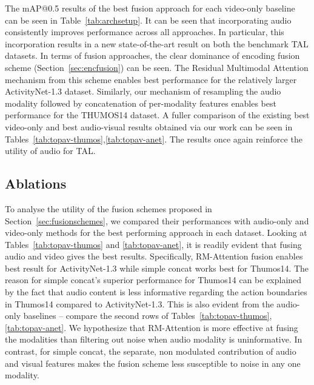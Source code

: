 \documentclass[10pt,twocolumn,letterpaper]{article}
\begin{document}
The mAP@0.5 results of the best fusion approach for each video-only baseline can be seen in Table~\ref{tab:archsetup}. It can be seen that incorporating audio consistently improves performance across all approaches. In particular, this incorporation results in a new state-of-the-art result on both the benchmark TAL datasets. In terms of fusion approaches, the clear dominance of encoding fusion scheme (Section~\ref{sec:encfusion}) can be seen. The Residual Multimodal Attention mechanism from this scheme enables best performance for the relatively larger ActivityNet-1.3 dataset. Similarly, our mechanism of resampling the audio modality followed by concatenation of per-modality features enables best performance for the THUMOS14 dataset. A fuller comparison of the existing best video-only and best audio-visual results obtained via our work can be seen in  Tables~\ref{tab:topav-thumos},\ref{tab:topav-anet}. The results once again reinforce the utility of audio for TAL. 





\subsection{Ablations}

To analyse the utility of the fusion schemes proposed in Section~\ref{sec:fusionschemes}, we compared their performances with audio-only  and video-only methods for the best performing approach in each dataset. Looking at Tables~\ref{tab:topav-thumos} and \ref{tab:topav-anet}, it is readily evident that fusing audio and video gives the best results. Specifically, RM-Attention fusion enables best result for ActivityNet-1.3 while simple concat works best for Thumos14. The reason for simple concat's superior performance for Thumos14 can be explained by the fact that audio content is less informative regarding the action boundaries in Thumos14 compared to ActivityNet-1.3. This is also evident from the audio-only baselines -- compare the second rows of Tables~\ref{tab:topav-thumos},\ref{tab:topav-anet}. We hypothesize that RM-Attention is more effective at fusing the modalities than filtering out noise when audio modality is uninformative.  In contrast, for simple concat, the separate, non modulated contribution of audio and visual features makes the fusion scheme less susceptible to noise in any one modality. 
\end{document}

